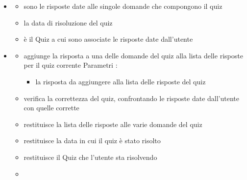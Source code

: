 \begin{itemize}
\item {}
\begin{itemize}
\item {}
\newline
sono le risposte date alle singole domande che compongono il quiz
\item {}
\newline
la data di risoluzione del quiz
\item {}
\newline
è il Quiz a cui sono associate le risposte date dall'utente
\end{itemize}
\item {}
\begin{itemize}
\item {}
\newline
aggiunge la risposta a una delle domande del quiz alla lista delle risposte per il quiz corrente
\newline
Parametri :
\begin{itemize}
\item {}
\newline
la risposta da aggiungere alla lista delle risposte del quiz
\end{itemize}
\item {}
\newline
verifica la correttezza del quiz, confrontando le risposte date dall'utente con quelle corrette
\newline
\item {}
\newline
restituisce la lista delle risposte alle varie domande del quiz
\newline
\item {}
\newline
restituisce la data in cui il quiz è stato risolto
\newline
\item {}
\newline
restituisce il Quiz che l'utente sta risolvendo
\newline
\item {}
\newline

\end{itemize}
\end{itemize}
